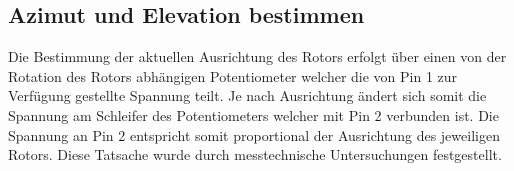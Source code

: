 \subsection {Azimut und Elevation bestimmen}
Die Bestimmung der aktuellen Ausrichtung des Rotors erfolgt über einen von der Rotation des Rotors abhängigen Potentiometer welcher die von Pin 1 zur Verfügung gestellte Spannung teilt. Je nach Ausrichtung ändert sich somit die Spannung am Schleifer des Potentiometers welcher mit Pin 2 verbunden ist. Die Spannung an Pin 2 entspricht somit proportional der Ausrichtung des jeweiligen Rotors. Diese Tatsache wurde durch messtechnische Untersuchungen festgestellt.

